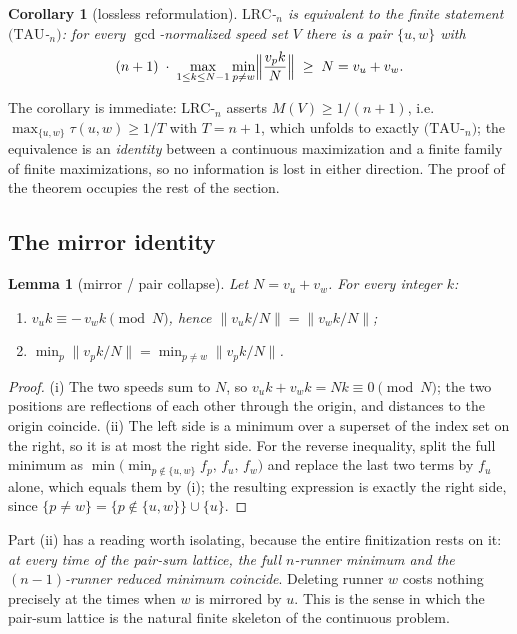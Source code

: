 \documentclass[11pt,a4paper]{article}
\numberwithin{equation}{section}
\theoremstyle{plain}
\newtheorem{lemma}[theorem]{Lemma}
\newtheorem{corollary}[theorem]{Corollary}
\theoremstyle{definition}
\theoremstyle{remark}
\begin{document}
\begin{corollary}[lossless reformulation]\label{cor:tau}
$\mathrm{LRC}$-$_n$ is equivalent to the finite statement
$(\mathrm{TAU}$-$_n)$: for every $\gcd$-normalized speed set $V$ there is
a pair $\{u,w\}$ with
\[
(n+1)\;\cdot\;\max_{1\le k\le N-1}\min_{p\ne w}
\Bigl\lVert \frac{v_p k}{N}\Bigr\rVert \;\ge\; N=v_u+v_w .
\]
\end{corollary}

The corollary is immediate: $\mathrm{LRC}$-$_n$ asserts $M(V)\ge
1/(n{+}1)$, i.e.\ $\max_{\{u,w\}}\tau(u,w)\ge 1/T$ with $T=n{+}1$, which
unfolds to exactly $(\mathrm{TAU}$-$_n)$; the equivalence is an
\emph{identity} between a continuous maximization and a finite family of
finite maximizations, so no information is lost in either direction. The
proof of the theorem occupies the rest of the section.

\subsection{The mirror identity}

\begin{lemma}[mirror / pair collapse]\label{lem:mirror}
Let $N=v_u+v_w$. For every integer $k$:
\begin{enumerate}[leftmargin=1.8em,itemsep=1pt]
\item[(i)] $v_u k\equiv -\,v_w k \pmod N$, hence
  $\lVert v_u k/N\rVert=\lVert v_w k/N\rVert$;
\item[(ii)] $\min_{p}\lVert v_p k/N\rVert
  =\min_{p\ne w}\lVert v_p k/N\rVert$.
\end{enumerate}
\end{lemma}

\begin{proof}
(i) The two speeds sum to $N$, so
$v_u k+v_w k=Nk\equiv 0 \pmod N$; the two positions are reflections of
each other through the origin, and distances to the origin coincide.
(ii) The left side is a minimum over a superset of the index set on the
right, so it is at most the right side. For the reverse inequality,
split the full minimum as
$\min\bigl(\min_{p\notin\{u,w\}} f_p,\,f_u,\,f_w\bigr)$ and replace the
last two terms by $f_u$ alone, which equals them by (i); the resulting
expression is exactly the right side, since
$\{p\ne w\}=\{p\notin\{u,w\}\}\cup\{u\}$.
\end{proof}

Part (ii) has a reading worth isolating, because the entire finitization
rests on it: \emph{at every time of the pair-sum lattice, the full
$n$-runner minimum and the $(n{-}1)$-runner reduced minimum coincide}.
Deleting runner $w$ costs nothing precisely at the times when $w$ is
mirrored by $u$. This is the sense in which the pair-sum lattice is the
natural finite skeleton of the continuous problem.
\end{document}
